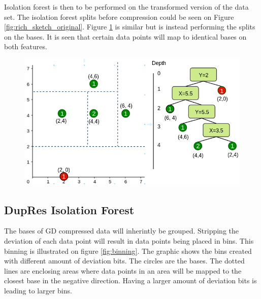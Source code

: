 Isolation forest is then to be performed on the transformed version of the data set. The isolation forest splits before compression could be seen on Figure \ref{fig:rich_sketch_original}. Figure \ref{fig:rich_sketch_bases} is similar but is instead performing the splits on the bases. It is seen that certain data points will map to identical bases on both features.  

\begin{figure}
  \centering
  \includegraphics[width=\linewidth]{images/rich_sketch_bases.png}
  \caption{}
  \label{fig:rich_sketch_bases}
\end{figure}


\subsection{DupRes Isolation Forest}
The bases of GD compressed data will inherintly be grouped. Stripping the deviation of each data point will result in data points being placed in bins. This binning is illustrated on figure \ref*{fig:binning}. The graphic shows the bins created with different amount of deviation bits. The circles are the bases. The dotted lines are enclosing areas where data points in an area will be mapped to the closest base in the negative direction. Having a larger amount of deviation bits is leading to larger bins. 

